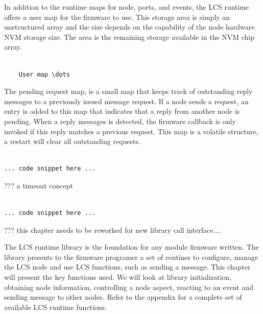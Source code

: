 
In addition to the runtime maps for node, ports, and events, the LCS runtime offers a user map for the firmware to use. This storage area is simply an unstructured array and the size depends on the capability of the node hardware NVM storage size. The area is the remaining storage available in the NVM chip array.


\lstset{language=c++, style=codesnippetstyle}
\begin{lstlisting}

    User map \dots

\end{lstlisting}
\FloatBarrier


The pending request map, is a small map that keeps track of outstanding reply messages to a previously issued message request. If a node sends a request, an entry is added to this map that indicates that a reply from another node is pending. When a reply messages is detected, the firmware callback is only invoked if this reply matches a previous request. This map is a volatile structure, a restart will clear all outstanding requests.

\lstset{language=c++, style=codesnippetstyle}
\begin{lstlisting}

... code snippet here ...

\end{lstlisting}
\FloatBarrier

??? a timeout concept


\lstset{language=c++, style=codesnippetstyle}
\begin{lstlisting}

... code snippet here ...

\end{lstlisting}
\FloatBarrier


??? this chapter needs to be reworked for new library call interface....

The LCS runtime library is the foundation for any module firmware written. The library presents to the firmware programer a set of routines to configure, manage the LCS node and use LCS functions, such as sending a message. This chapter will present the key functions used. We will look at library initialization, obtaining node information, controlling a node aspect, reacting to an event and sending message to other nodes.
Refer to the appendix for a complete set of available LCS runtime functions.


